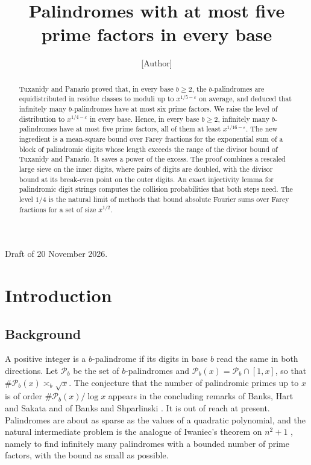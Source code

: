 \documentclass[11pt]{amsart}
\title{Palindromes with at most five prime factors in every base}
\author{[Author]}
\date{}
\theoremstyle{definition}
\numberwithin{equation}{section}
\newcommand{\PP}{\mathscr{P}}
\begin{document}
\begin{abstract}
Tuxanidy and Panario proved that, in every base $b\ge2$, the $b$-palindromes are equidistributed in residue classes to moduli up to $x^{1/5-\varepsilon}$ on average, and deduced that infinitely many $b$-palindromes have at most six prime factors. We raise the level of distribution to $x^{1/4-\varepsilon}$ in every base. Hence, in every base $b\ge2$, infinitely many $b$-palindromes have at most five prime factors, all of them at least $x^{1/16-\varepsilon}$. The new ingredient is a mean-square bound over Farey fractions for the exponential sum of a block of palindromic digits whose length exceeds the range of the divisor bound of Tuxanidy and Panario. It saves a power of the excess. The proof combines a rescaled large sieve on the inner digits, where pairs of digits are doubled, with the divisor bound at its break-even point on the outer digits. An exact injectivity lemma for palindromic digit strings computes the collision probabilities that both steps need. The level $1/4$ is the natural limit of methods that bound absolute Fourier sums over Farey fractions for a set of size $x^{1/2}$.
\end{abstract}

\maketitle

\noindent Draft of 20 November 2026.

\section{Introduction}\label{sec:intro}

\subsection{Background}

A positive integer is a $b$-palindrome if its digits in base $b$ read the same in both directions. Let $\PP_b$ be the set of $b$-palindromes and $\PP_b(x)=\PP_b\cap[1,x]$, so that $\#\PP_b(x)\asymp_b\sqrt{x}$. The conjecture that the number of palindromic primes up to $x$ is of order $\#\PP_b(x)/\log x$ appears in the concluding remarks of Banks, Hart and Sakata \cite{BHS} and of Banks and Shparlinski \cite{BS}. It is out of reach at present. Palindromes are about as sparse as the values of a quadratic polynomial, and the natural intermediate problem is the analogue of Iwaniec's theorem on $n^2+1$ \cite{Iw}, namely to find infinitely many palindromes with a bounded number of prime factors, with the bound as small as possible.
\end{document}
